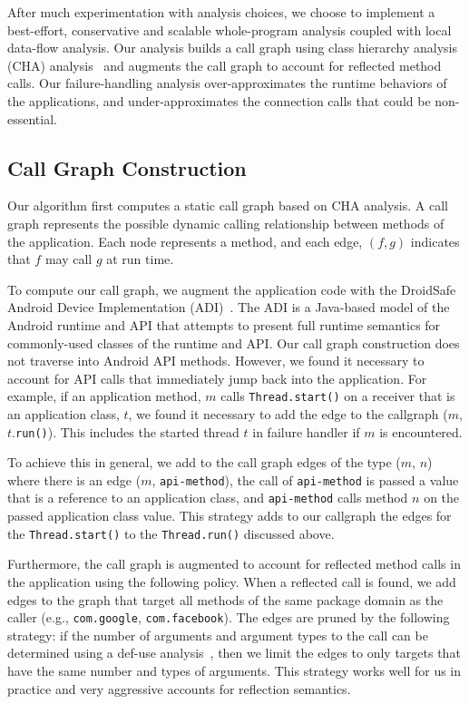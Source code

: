 After much experimentation with analysis choices, we choose to
implement a best-effort, conservative and scalable whole-program
analysis coupled with local data-flow analysis. Our analysis builds a
call graph using class hierarchy analysis (CHA)
analysis~\cite{Dean1995} and augments the call graph to account for
reflected method calls.  Our failure-handling analysis
over-approximates the runtime behaviors of the applications, and
under-approximates the connection calls that could be non-essential.

\subsection{Call Graph Construction}

Our algorithm first computes a static call graph based on CHA
analysis.  A call graph represents the possible dynamic calling
relationship between methods of the application.  Each node represents
a method, and each edge, $(f,g)$ indicates that $f$ may call $g$ at
run time.

To compute our call graph, we augment the application code with the
DroidSafe Android Device Implementation
(ADI)~\cite{Gordon:Kim:Perkins:Gilham:Nguyen:Rinard:NDSS15}.  The ADI
is a Java-based model of the Android runtime and API that attempts to
present full runtime semantics for commonly-used classes of the
runtime and API.  Our call graph construction does not traverse into
Android API methods.  However, we found it necessary to account for
API calls that immediately jump back into the application.  For
example, if an application method, $m$ calls
\lstinline!Thread.start()! on a receiver that is an application class,
$t$, we found it necessary to add the edge to the callgraph ($m$,
$t$.\lstinline!run()!).  This includes the started thread $t$ in
failure handler if $m$ is encountered.

To achieve this in general, we add to the call graph edges of the type
($m$, $n$) where there is an edge ($m$, \lstinline!api-method!), the
call of \lstinline!api-method! is passed a value that is a reference
to an application class, and \lstinline!api-method! calls method $n$
on the passed application class value.  This strategy adds to our
callgraph the edges for the \lstinline!Thread.start()! to the
\lstinline!Thread.run()! discussed above.

Furthermore, the call graph is augmented to account for reflected
method calls in the application using the following policy.  When a
reflected call is found, we add edges to the graph that target all
methods of the same package domain as the caller (e.g.,
\lstinline!com.google!, \lstinline!com.facebook!).  The edges are pruned by the
following strategy: if the number of arguments and argument types to
the call can be determined using a def-use analysis~\cite{Aho2006},
then we limit the edges to only targets that have the same number and
types of arguments.  This strategy works well for us in
practice and very aggressive accounts for reflection semantics.


